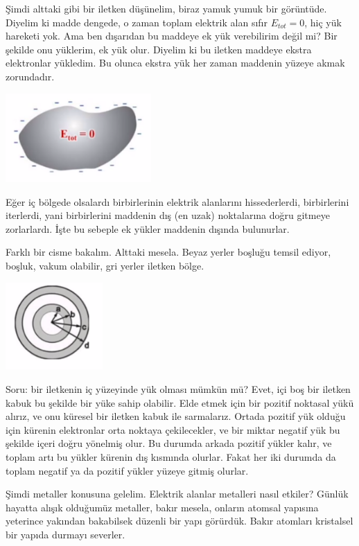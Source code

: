 \documentclass[12pt,fleqn]{article}\usepackage{../../common}
\begin{document}
Şimdi alttaki gibi bir iletken düşünelim, biraz yamuk yumuk bir
görüntüde. Diyelim ki madde dengede, o zaman toplam elektrik alan sıfır
$E_{tot} = 0$, hiç yük hareketi yok. Ama ben dışarıdan bu maddeye ek yük
verebilirim değil mi? Bir şekilde onu yüklerim, ek yük olur. Diyelim ki bu
iletken maddeye ekstra elektronlar yükledim. Bu olunca ekstra yük her zaman
maddenin yüzeye akmak zorundadır.

\includegraphics[width=15em]{04_11.png}

Eğer iç bölgede olsalardı birbirlerinin elektrik alanlarını hissederlerdi,
birbirlerini iterlerdi, yani birbirlerini maddenin dış (en uzak)
noktalarına doğru gitmeye zorlarlardı. İşte bu sebeple ek yükler maddenin
dışında bulunurlar.

Farklı bir cisme bakalım. Alttaki mesela. Beyaz yerler boşluğu temsil
ediyor, boşluk, vakum olabilir, gri yerler iletken bölge. 

\includegraphics[width=10em]{04_12.png}

Soru: bir iletkenin iç yüzeyinde yük olması mümkün mü? Evet, içi boş bir
iletken kabuk bu şekilde bir yüke sahip olabilir. Elde etmek için bir
pozitif noktasal yükü alırız, ve onu küresel bir iletken kabuk ile
sarmalarız. Ortada pozitif yük olduğu için kürenin elektronlar orta noktaya
çekilecekler, ve bir miktar negatif yük bu şekilde içeri doğru yönelmiş
olur. Bu durumda arkada pozitif yükler kalır, ve toplam artı bu yükler
kürenin dış kısmında olurlar. Fakat her iki durumda da toplam negatif ya da
pozitif yükler yüzeye gitmiş olurlar.

Şimdi metaller konusuna gelelim. Elektrik alanlar metalleri nasıl etkiler?
Günlük hayatta alışık olduğumüz metaller, bakır mesela, onların atomsal
yapısına yeterince yakından bakabilsek düzenli bir yapı görürdük. Bakır
atomları kristalsel bir yapıda durmayı severler. 
\end{document}
